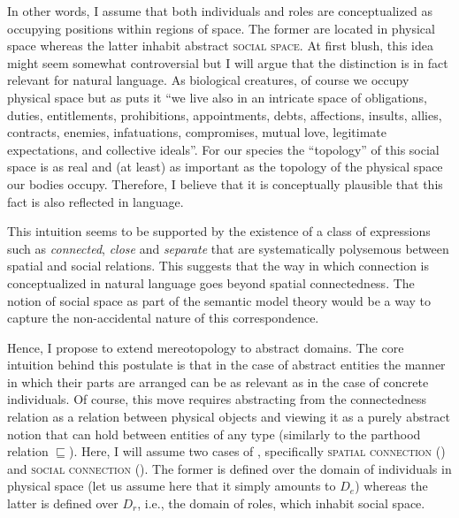 \documentclass[output=paper]{langscibook}
\begin{document}
In other words, I assume that both individuals and roles are conceptualized as occupying positions within regions of space. The former are located in physical space whereas the latter inhabit abstract \textsc{social space}. At first blush, this idea might seem somewhat controversial but I will argue that the distinction is in fact relevant for natural language. As biological creatures, of course we occupy physical space but as \citet[123]{churchland1996engine} puts it ``we live also in an intricate space of obligations, duties, entitlements, prohibitions, appointments, debts, affections, insults, allies, contracts, enemies, infatuations, compromises, mutual love, legitimate expectations, and collective ideals''. For our species the ``topology'' of this social space is as real and (at least) as important as the topology of the physical space our bodies occupy. Therefore, I believe that it is conceptually plausible that this fact is also reflected in language.

This intuition seems to be supported by the existence of a class of expressions such as \textit{connected}, \textit{close} and \textit{separate} that are systematically polysemous between spatial and social relations. This suggests that the way in which connection is conceptualized in natural language goes beyond spatial connectedness. The notion of social space as part of the semantic model theory would be a way to capture the non-accidental nature of this correspondence.

Hence, I propose to extend mereotopology to abstract domains. The core intuition behind this postulate is that in the case of abstract entities the manner in which their parts are arranged can be as relevant as in the case of concrete individuals. Of course, this move requires abstracting from the connectedness relation  as a relation between physical objects and viewing it as a purely abstract notion that can hold between entities of any type (similarly to the parthood relation $\sqsubseteq$). Here, I will assume two cases of , specifically \textsc{spatial connection} () and \textsc{social connection} (). The former is defined over the domain of individuals in physical space (let us assume here that it simply amounts to $D_e$) whereas the latter is defined over $D_r$, i.e., the domain of roles, which inhabit social space. 
\end{document}
